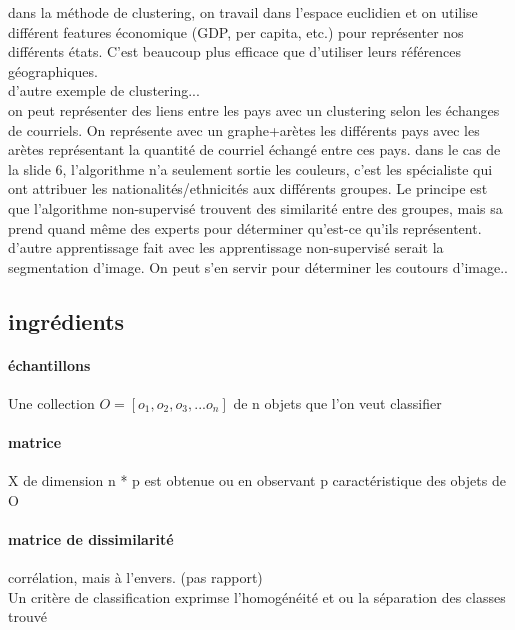 \documentclass[oneside]{book}
\begin{document}
dans la méthode de clustering, on travail dans l'espace euclidien et on utilise différent features économique (GDP, per capita, etc.) pour représenter nos différents états. C'est beaucoup plus efficace que d'utiliser leurs références géographiques. \\

d'autre exemple de clustering...\\

on peut représenter des liens entre les pays avec un clustering selon les échanges de courriels. On représente avec un graphe+arètes les différents pays avec les arètes représentant la quantité de courriel échangé entre ces pays. dans le cas de la slide 6, l'algorithme n'a seulement sortie les couleurs, c'est les spécialiste qui ont attribuer les nationalités/ethnicités aux différents groupes. Le principe est que l'algorithme non-supervisé trouvent des similarité entre des groupes, mais sa prend quand même des experts pour déterminer qu'est-ce qu'ils représentent.\\

d'autre apprentissage fait avec les apprentissage non-supervisé serait la segmentation d'image. On peut s'en servir pour déterminer les coutours d'image.. \\

\subsection{ingrédients}
\paragraph{échantillons} Une collection $O = [o_1,o_2,o_3,...o_n]$ de n objets que l'on veut classifier\\

\paragraph{matrice} X de dimension n * p est obtenue ou en observant  p caractéristique des objets de O\\

\paragraph{matrice de dissimilarité} corrélation, mais à l'envers. (pas rapport)\\

Un critère de classification exprimse l'homogénéité et ou la séparation des classes trouvé \\
\end{document}
